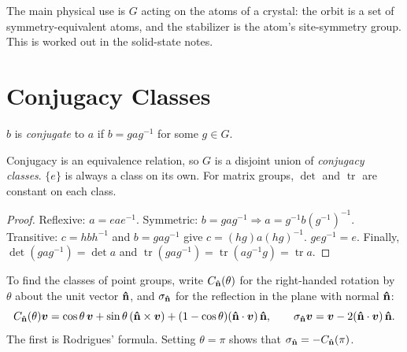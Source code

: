 The main physical use is $G$ acting on the atoms of a crystal: the orbit is a set of symmetry-equivalent atoms, and the stabilizer is the atom's site-symmetry group. This is worked out in the solid-state notes.

\section{Conjugacy Classes}

\begin{definition}[Conjugacy]
$b$ is \emph{conjugate} to $a$ if $b = gag^{-1}$ for some $g\in G$.
\end{definition}

\begin{theorem}
Conjugacy is an equivalence relation, so $G$ is a disjoint union of \emph{conjugacy classes}. $\{e\}$ is always a class on its own. For matrix groups, $\det$ and $\operatorname{tr}$ are constant on each class.
\end{theorem}
\begin{proof}
Reflexive: $a = eae^{-1}$. Symmetric: $b = gag^{-1}\Rightarrow a = g^{-1}b(g^{-1})^{-1}$. Transitive: $c = hbh^{-1}$ and $b = gag^{-1}$ give $c = (hg)a(hg)^{-1}$. $geg^{-1} = e$. Finally, $\det(gag^{-1}) = \det a$ and $\operatorname{tr}(gag^{-1}) = \operatorname{tr}(ag^{-1}g) = \operatorname{tr}a$.
\end{proof}

To find the classes of point groups, write $C_{\boldsymbol{\hat{\textbf{n}}}}(\theta)$ for the right-handed rotation by $\theta$ about the unit vector $\boldsymbol{\hat{\textbf{n}}}$, and $\sigma_{\boldsymbol{\hat{\textbf{n}}}}$ for the reflection in the plane with normal $\boldsymbol{\hat{\textbf{n}}}$:
\begin{equation}
    C_{\boldsymbol{\hat{\textbf{n}}}}(\theta)\bm{v} = \cos\theta\,\bm{v} + \sin\theta\,(\boldsymbol{\hat{\textbf{n}}}\times\bm{v}) + (1-\cos\theta)(\boldsymbol{\hat{\textbf{n}}}\cdot\bm{v})\,\boldsymbol{\hat{\textbf{n}}},
    \qquad
    \sigma_{\boldsymbol{\hat{\textbf{n}}}}\bm{v} = \bm{v} - 2(\boldsymbol{\hat{\textbf{n}}}\cdot\bm{v})\,\boldsymbol{\hat{\textbf{n}}}.
\end{equation}
The first is Rodrigues' formula. Setting $\theta = \pi$ shows that $\sigma_{\boldsymbol{\hat{\textbf{n}}}} = -C_{\boldsymbol{\hat{\textbf{n}}}}(\pi)$.

